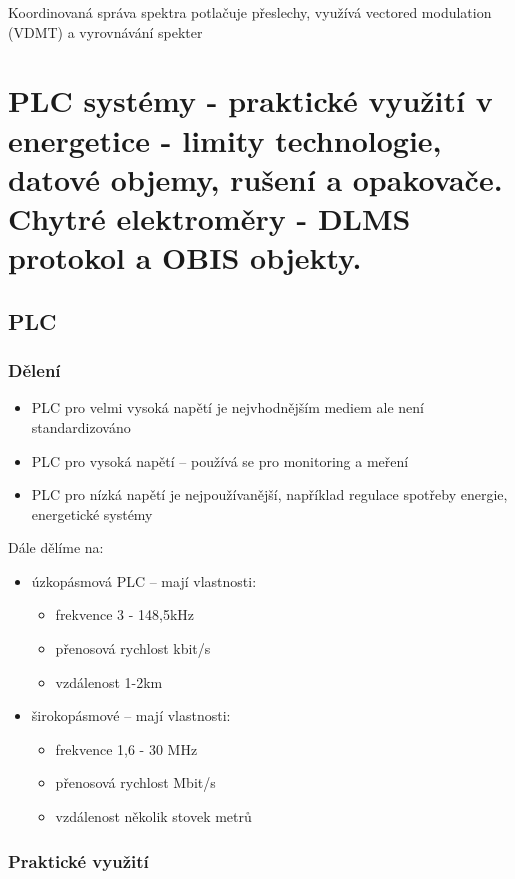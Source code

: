 Koordinovaná správa spektra potlačuje přeslechy, využívá vectored modulation (VDMT) a vyrovnávání spekter


\clearpage
\section{PLC systémy - praktické využití v energetice - limity technologie, datové objemy, rušení a opakovače. Chytré elektroměry - DLMS protokol a OBIS objekty.}

\subsection{PLC}
\subsubsection{Dělení}

\begin{itemize}
    \item PLC pro velmi vysoká napětí je nejvhodnějším mediem ale není standardizováno
    \item PLC pro vysoká napětí -- používá se pro monitoring a meření
    \item PLC pro nízká napětí je nejpoužívanější, například regulace spotřeby energie, energetické systémy
\end{itemize}

Dále dělíme na:
\begin{itemize}
    \item úzkopásmová PLC -- mají vlastnosti:
    \begin{itemize}
        \item frekvence 3 - 148,5kHz
        \item přenosová rychlost kbit/s
        \item vzdálenost 1-2km
    \end{itemize}
    \item širokopásmové -- mají vlastnosti:
    \begin{itemize}
        \item frekvence 1,6 - 30 MHz
        \item přenosová rychlost Mbit/s
        \item vzdálenost několik stovek metrů
    \end{itemize}
\end{itemize}

\subsubsection{Praktické využití}


